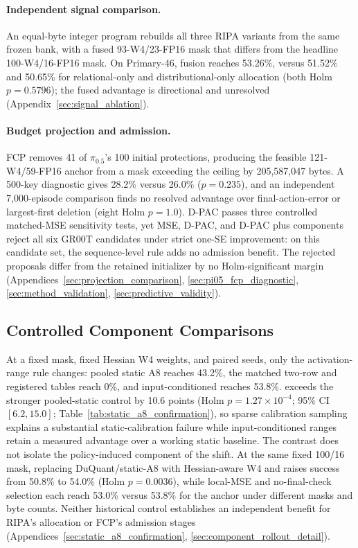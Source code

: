 \paragraph{Independent signal comparison.}
An equal-byte integer program rebuilds all three RIPA variants from the same frozen bank, with a fused 93-W4/23-FP16 mask that differs from the headline 100-W4/16-FP16 mask. On Primary-46, fusion reaches 53.26\%, versus 51.52\% and 50.65\% for relational-only and distributional-only allocation (both Holm $p=0.5796$); the fused advantage is directional and unresolved (Appendix~\ref{sec:signal_ablation}).

\paragraph{Budget projection and admission.}
FCP removes 41 of $\pi_{0.5}$'s 100 initial protections, producing the feasible 121-W4/59-FP16 anchor from a mask exceeding the ceiling by 205,587,047 bytes. A 500-key diagnostic gives 28.2\% versus 26.0\% ($p=0.235$), and an independent 7,000-episode comparison finds no resolved advantage over final-action-error or largest-first deletion (eight Holm $p=1.0$). D-PAC passes three controlled matched-MSE sensitivity tests, yet MSE, D-PAC, and D-PAC plus components reject all six GR00T candidates under strict one-SE improvement: on this candidate set, the sequence-level rule adds no admission benefit. The rejected proposals differ from the retained initializer by no Holm-significant margin (Appendices~\ref{sec:projection_comparison}, \ref{sec:pi05_fcp_diagnostic}, \ref{sec:method_validation}, \ref{sec:predictive_validity}).

\subsection{Controlled Component Comparisons}
\label{sec:core_ablation_main}


At a fixed mask, fixed Hessian W4 weights, and paired seeds, only the activation-range rule changes: pooled static A8 reaches 43.2\%, the matched two-row and registered tables reach 0\%, and input-conditioned \dyrange reaches 53.8\%. \dyrange exceeds the stronger pooled-static control by 10.6 points (Holm $p=1.27\times10^{-4}$; 95\% CI $[6.2,15.0]$; Table~\ref{tab:static_a8_confirmation}), so sparse calibration sampling explains a substantial static-calibration failure while input-conditioned ranges retain a measured advantage over a working static baseline. The contrast does not isolate the policy-induced component of the shift. At the same fixed 100/16 mask, replacing DuQuant/static-A8 with Hessian-aware W4 and \dyrange raises success from 50.8\% to 54.0\% (Holm $p=0.0036$), while local-MSE and no-final-check selection each reach 53.0\% versus 53.8\% for the anchor under different masks and byte counts. Neither historical control establishes an independent benefit for RIPA's allocation or FCP's admission stages (Appendices~\ref{sec:static_a8_confirmation}, \ref{sec:component_rollout_detail}).
